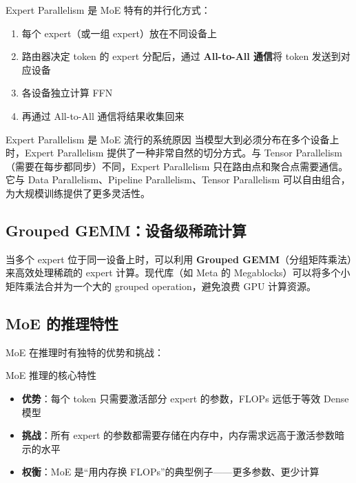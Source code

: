 \documentclass[a4paper]{article}
\begin{document}
Expert Parallelism 是 MoE 特有的并行化方式：

\begin{enumerate}
    \item 每个 expert（或一组 expert）放在不同设备上
    \item 路由器决定 token 的 expert 分配后，通过 \textbf{All-to-All 通信}将 token 发送到对应设备
    \item 各设备独立计算 FFN
    \item 再通过 All-to-All 通信将结果收集回来
\end{enumerate}

\begin{knowledgebox}{Expert Parallelism 是 MoE 流行的系统原因}
当模型大到必须分布在多个设备上时，Expert Parallelism 提供了一种非常自然的切分方式。与 Tensor Parallelism（需要在每步都同步）不同，Expert Parallelism 只在路由点和聚合点需要通信。它与 Data Parallelism、Pipeline Parallelism、Tensor Parallelism 可以自由组合，为大规模训练提供了更多灵活性。
\end{knowledgebox}

\subsection{Grouped GEMM：设备级稀疏计算}

当多个 expert 位于同一设备上时，可以利用 \textbf{Grouped GEMM}（分组矩阵乘法）来高效处理稀疏的 expert 计算。现代库（如 Meta 的 Megablocks）可以将多个小矩阵乘法合并为一个大的 grouped operation，避免浪费 GPU 计算资源。

\subsection{MoE 的推理特性}

MoE 在推理时有独特的优势和挑战：

\begin{importantbox}{MoE 推理的核心特性}
\begin{itemize}
    \item \textbf{优势}：每个 token 只需要激活部分 expert 的参数，FLOPs 远低于等效 Dense 模型
    \item \textbf{挑战}：所有 expert 的参数都需要存储在内存中，内存需求远高于激活参数暗示的水平
    \item \textbf{权衡}：MoE 是``用内存换 FLOPs''的典型例子——更多参数、更少计算
\end{itemize}
\end{importantbox}
\end{document}

